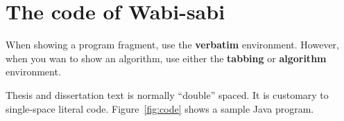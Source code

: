 \documentclass[dissertation, proposal]{bsu-cs}  %
\begin{document}
\section{The code of Wabi-sabi}

When showing a program fragment, use the \textbf{verbatim} environment. However, when you wan
to show an algorithm, use either the \textbf{tabbing} or \textbf{algorithm} environment.

Thesis and dissertation text is normally ``double'' spaced.  It is customary to single-space
literal code.  Figure~\ref{fig:code} shows a sample Java program.

%
%
%
% 
\end{document}
